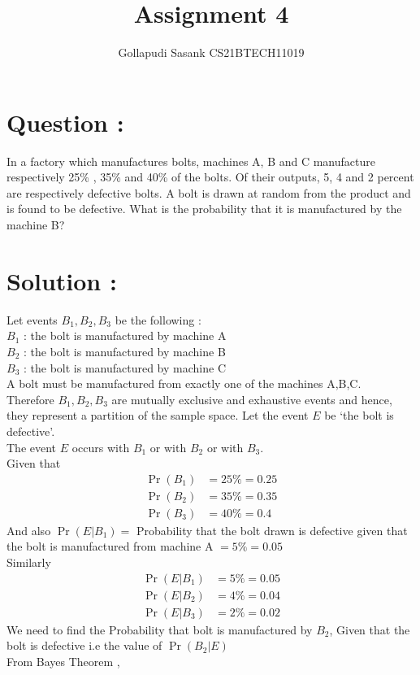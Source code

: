 \documentclass[journal,twocolumn]{IEEEtran}
\title{Assignment 4}
\author{Gollapudi Sasank CS21BTECH11019}
\providecommand{\pr}[1]{\ensuremath{\Pr\left(#1\right)}}
\begin{document}
\maketitle
\section*{Question : }
In a factory which manufactures bolts, machines A, B and C manufacture
respectively 25\% , 35\% and 40\% of the bolts. Of their outputs, 5, 4 and 2 percent are respectively defective bolts. A bolt is drawn at random from the product and is found to be defective. What is the probability that it is manufactured by the machine B?
\section*{Solution : }
Let  events $B_1,B_2,B_3$ be the following : \\
$B_1$ : the bolt is manufactured by machine A \\
$B_2$ : the bolt is manufactured by machine B \\
$B_3$ : the bolt is manufactured by machine C \\
A bolt must be manufactured from exactly one of the machines A,B,C.\\
Therefore $B_1,B_2,B_3$ are mutually exclusive and exhaustive events and hence, they represent a partition of the sample space.
Let the event $E$ be `the bolt is defective'.\\
The event $E$ occurs with $B_1$ or with $B_2$ or with $B_3$.\\
Given that 
\begin{align}
\pr{B_1} &= 25\% = 0.25 \\
\pr{B_2} &= 35\% = 0.35 \\
\pr{B_3} &= 40\% = 0.4 
\end{align} 
And also $\pr{E|B_1} = $ Probability that the bolt drawn is defective given that the bolt is manufactured from machine A $ = 5\% = 0.05 $ \\
Similarly
\begin{align}
\pr{E|B_1} &= 5\% = 0.05 \\
\pr{E|B_2} &= 4\% = 0.04 \\
\pr{E|B_3} &= 2\% = 0.02
\end{align}
We need to find the Probability that bolt is manufactured by $B_2$, Given that the bolt is defective i.e  the value of $\pr{B_2|E}$ \\
From Bayes Theorem , \\
\end{document}
